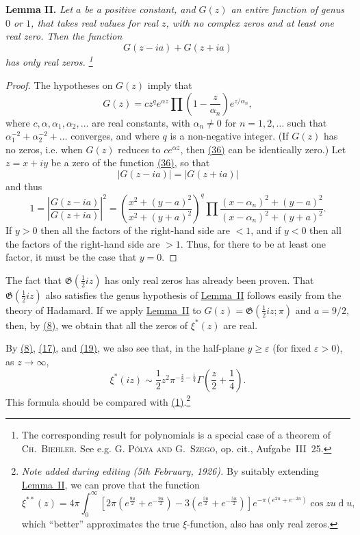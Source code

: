 \documentclass{article}
\theoremstyle{plain}
\newenvironment{itenv}[1]
  {\phantomsection\par\medskip\noindent\textbf{#1.}\itshape}
  {\par\medskip}
\newcommand{\dd}{\operatorname{d}\!}
\newcommand{\GG}{\mathfrak{G}}
\newcommand{\oldpage}[1]{\marginpar{\footnotesize$\Big\vert$ \textit{p.~#1}}}
\begin{document}
\begin{itenv}{Lemma II}
\label{lemma2}
  Let $a$ be a positive constant, and $G(z)$ an entire function of genus $0$ or $1$, that takes real values for real $z$, with no complex zeros and at least one real zero.
  Then the function
  \[
  \label{36}
    G(z-ia) + G(z+ia)
  \tag{36}
  \]
  has only real zeros.
  \footnote{The corresponding result for polynomials is a special case of a theorem of \textsc{Ch.~Biehler}. See e.g. \textsc{G. P\'{o}lya and G.~Szeg\"{o}}, op. cit., Aufgabe~III~25.}
\end{itenv}
\begin{proof}
  The hypotheses on $G(z)$ imply that
  \[
    G(z) = c z^q e^{\alpha z} \prod\left(1-\frac{z}{\alpha_n}\right)e^{z/\alpha_n},
  \]
  where $c,\alpha,\alpha_1,\alpha_2,\ldots$ are real constants, with $\alpha_n\neq0$ for $n=1,2,\ldots$ such that $\alpha_1^{-2}+\alpha_2^{-2}+\ldots$ converges, and where $q$ is a non-negative integer.
  (If $G(z)$ has no zeros, i.e. when $G(z)$ reduces to $ce^{\alpha z}$, then \hyperref[36]{(36)} can be identically zero.)
  Let $z=x+iy$ be a zero of the function \hyperref[36]{(36)}, so that
  \[
    |G(z-ia)| = |G(z+ia)|
  \]
  and thus
  \[
    1
    =
    \left\vert
      \frac{G(z-ia)}{G(z+ia)}
    \right\vert^2
    =
    \left(
      \frac{x^2+(y-a)^2}{x^2+(y+a)^2}
    \right)^q
    \prod \frac{(x-\alpha_n)^2+(y-a)^2}{(x-\alpha_n)^2+(y+a)^2}.
  \]
\oldpage{317}
  If $y>0$ then all the factors of the right-hand side are $<1$, and if $y<0$ then all the factors of the right-hand side are $>1$.
  Thus, for there to be at least one factor, it must be the case that $y=0$.
\end{proof}

The fact that $\GG(\frac12 iz)$ has only real zeros has already been proven.
That $\GG(\frac12 iz)$ also satisfies the genus hypothesis of \hyperref[lemma2]{Lemma~II} follows easily from the theory of Hadamard.
If we apply \hyperref[lemma2]{Lemma~II} to $G(z)=\GG(\frac12 iz;\pi)$ and $a=9/2$, then, by \hyperref[8]{(8)}, we obtain that all the zeros of $\xi^*(z)$ are real.

By \hyperref[8]{(8)}, \hyperref[17]{(17)}, and \hyperref[19]{(19)}, we also see that, in the half-plane $y\geqslant\varepsilon$ (for fixed $\varepsilon>0$), as $z\to\infty$,
\[
  \xi^*(iz) \sim \frac12 z^2 \pi^{-\frac{z}{2}-\frac14} \Gamma\left(\frac{z}{2}+\frac14\right).
\]
This formula should be compared with \hyperref[1]{(1)}.\footnote{\emph{Note added during editing (5th February, 1926).} By suitably extending \hyperref[lemma2]{Lemma~II}, we can prove that the function%
\[%
  \xi^{**}(z) = 4\pi\int_0^\infty\left[%
    2\pi\left(%
      e^{\frac{9u}{2}} + e^{-\frac{9u}{2}}%
    \right)%
    -3\left(%
      e^{\frac{5u}{2}} + e^{-\frac{5u}{2}}%
    \right)%
  \right]%
  e^{-\pi(e^{2u}+e^{-2u})} \cos zu \dd u,%
\]%
which ``better'' approximates the true $\xi$-function, also has only real zeros.}
\end{document}
